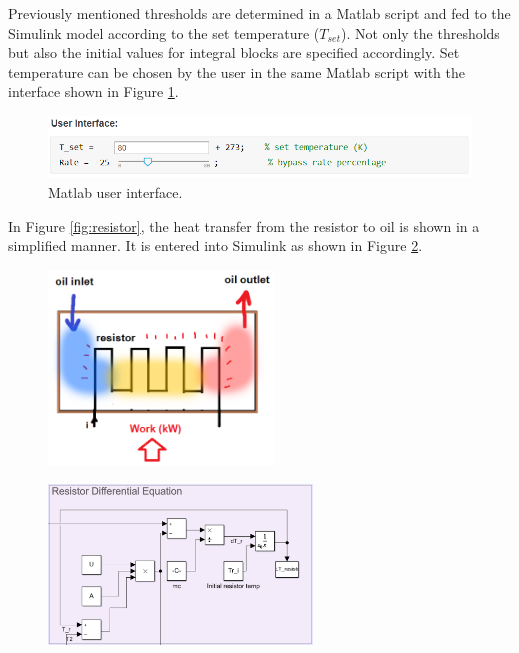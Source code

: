 \par
Previously mentioned thresholds are determined in a Matlab script and fed to the Simulink model according to the set temperature ($T_{set}$). Not only the thresholds but also the initial values for integral blocks are specified accordingly. Set temperature can be chosen by the user in the same Matlab script with the interface shown in Figure \ref{fig:user}.

\begin{figure}[h]
    \centering
    \includegraphics[width=12cm]{images/userinterface.png}
    \caption{Matlab user interface.}
    \label{fig:user}
\end{figure}

In Figure \ref{fig:resistor}, the heat transfer from the resistor to oil is shown in a simplified manner. It is entered into Simulink as shown in Figure \ref{fig:resistorsim}.

\begin{figure}[h]
    \begin{minipage}{.5\textwidth}
        \centering
        \includegraphics[width=6cm]{images/resistor.png}
        \label{fig:resistor}
    \end{minipage}
    \begin{minipage}{.4\textwidth}
        \centering
        \includegraphics[width=7cm]{images/resistorsim.png}
        \label{fig:resistorsim}
    \end{minipage}
\end{figure}

